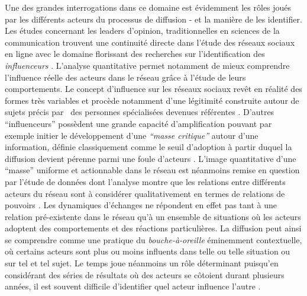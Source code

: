 Une des grandes interrogations dans ce domaine est évidemment les r\^oles joués par les différents acteurs du processus de diffusion - et la manière de les identifier. Les études concernant les leaders d{\textquoteright}opinion, traditionnelles en sciences de la communication \citep{Katz1955} trouvent une continuité directe dans l{\textquoteright}étude des réseaux sociaux en ligne avec le domaine florissant des recherches sur l{\textquoteright}identification des \textit{influenceurs} \citep{Bakshy2011, Leavitt2009}. L{\textquoteright}analyse quantitative permet notamment de mieux comprendre l{\textquoteright}influence réelle des acteurs dans le réseau gr\^ace à l{\textquoteright}étude de leurs comportements. Le concept d{\textquoteright}influence sur les réseaux sociaux rev\^et en réalité des formes très variables et procède notamment d{\textquoteright}une légitimité construite autour de sujets précis par \ des personnes spécialisées devenues référentes \citep{Cha2010}. D{\textquoteright}autres {\textquotedblleft}influenceurs{\textquotedblright} possèdent une grande capacité d{\textquoteright}amplification pouvant par exemple initier le développement d{\textquoteright}une \textit{{\textquotedblleft}masse critique{\textquotedblright} }autour d{\textquoteright}une information\textit{, }définie classiquement comme le seuil d{\textquoteright}adoption à partir duquel la diffusion devient pérenne parmi une foule d{\textquoteright}acteurs \citep{Oliver2001}. L{\textquoteright}image quantitative d{\textquoteright}une {\textquotedblleft}masse{\textquotedblright} uniforme et actionnable dans le réseau est néanmoins remise en question par l{\textquoteright}étude de données dont l{\textquoteright}analyse montre que les relations entre différents acteurs du réseau sont à considérer qualitativement en termes de relations de pouvoirs \citep{Steyer2006}\textit{. }Les dynamiques d{\textquoteright}échanges ne répondent en effet pas tant à une relation pré-existente dans le réseau qu{\textquoteright}à un ensemble de situations o\`u les acteurs adoptent des comportements et des réactions particulières. La diffusion peut ainsi se comprendre comme une pratique du \textit{bouche-à-oreille} éminemment contextuelle, o\`u certains acteurs sont plus ou moins influents dans telle ou telle situation ou sur tel et tel sujet. Le temps joue néanmoins un r\^ole déterminant puisqu{\textquoteright}en considérant des séries de résultats o\`u des acteurs se c\^otoient durant plusieurs années, il est souvent difficile d{\textquoteright}identifier quel acteur influence l{\textquoteright}autre \citep{Aral2009}.

